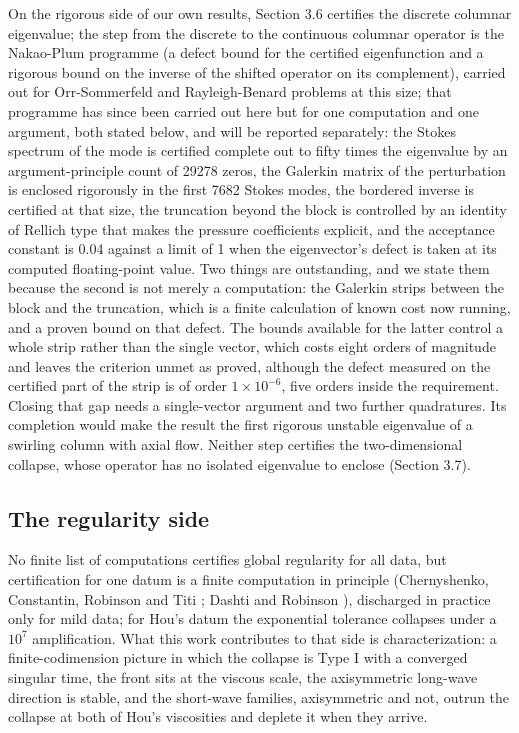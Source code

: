 \documentclass[11pt]{article}
\newcommand{\sn}[2]{#1\times 10^{#2}}
\begin{document}
On the rigorous side of our own results, Section 3.6 certifies the discrete columnar eigenvalue; the step from the discrete to the continuous columnar operator is the Nakao-Plum programme (a defect bound for the certified eigenfunction and a rigorous bound on the inverse of the shifted operator on its complement), carried out for Orr-Sommerfeld and Rayleigh-Benard problems at this size; that programme has since been carried out here but for one computation and one argument, both stated below, and will be reported separately: the Stokes spectrum of the mode is certified complete out to fifty times the eigenvalue by an argument-principle count of 29278 zeros, the Galerkin matrix of the perturbation is enclosed rigorously in the first 7682 Stokes modes, the bordered inverse is certified at that size, the truncation beyond the block is controlled by an identity of Rellich type that makes the pressure coefficients explicit, and the acceptance constant is 0.04 against a limit of 1 when the eigenvector's defect is taken at its computed floating-point value. Two things are outstanding, and we state them because the second is not merely a computation: the Galerkin strips between the block and the truncation, which is a finite calculation of known cost now running, and a proven bound on that defect. The bounds available for the latter control a whole strip rather than the single vector, which costs eight orders of magnitude and leaves the criterion unmet as proved, although the defect measured on the certified part of the strip is of order $\sn{1}{-6}$, five orders inside the requirement. Closing that gap needs a single-vector argument and two further quadratures. Its completion would make the result the first rigorous unstable eigenvalue of a swirling column with axial flow. Neither step certifies the two-dimensional collapse, whose operator has no isolated eigenvalue to enclose (Section 3.7).

\subsection{The regularity side}

No finite list of computations certifies global regularity for all data, but certification for one datum is a finite computation in principle (Chernyshenko, Constantin, Robinson and Titi \cite{CCRT07}; Dashti and Robinson \cite{DR08}), discharged in practice only for mild data; for Hou's datum the exponential tolerance collapses under a $10^{7}$ amplification. What this work contributes to that side is characterization: a finite-codimension picture in which the collapse is Type I with a converged singular time, the front sits at the viscous scale, the axisymmetric long-wave direction is stable, and the short-wave families, axisymmetric and not, outrun the collapse at both of Hou's viscosities and deplete it when they arrive.
\end{document}
